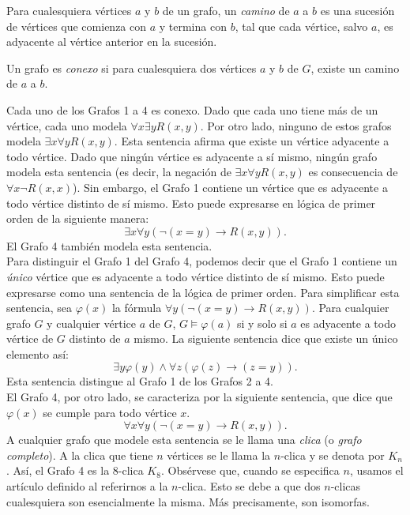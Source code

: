 \message{ !name(main.tex)}\documentclass[12pt,a4paper]{book}
\begin{document}
    \begin{definicion}\label{def:camino-grafo}
        Para cualesquiera vértices $a$ y $b$ de un grafo, un \textit{camino} de $a$ a $b$ es una sucesión de vértices que
        comienza con $a$ y termina con $b$, tal que cada vértice, salvo $a$, es adyacente al vértice anterior en la
        sucesión.
    \end{definicion}

    \begin{definicion}[Conexo]\label{def:conexo}
        Un grafo es \textit{conexo} si para cualesquiera dos vértices $a$ y $b$ de $G$, existe un camino de $a$ a $b$.
    \end{definicion}

    Cada uno de los Grafos 1 a 4 es conexo. Dado que cada uno tiene más de un vértice, cada uno modela
    $\forall x\exists yR(x,y)$. Por otro lado, ninguno de estos grafos modela $\exists x\forall yR(x,y)$. Esta sentencia
    afirma que existe un vértice adyacente a todo vértice. Dado que ningún vértice es adyacente a sí mismo, ningún grafo
    modela esta sentencia (es decir, la negación de $\exists x\forall yR(x,y)$ es consecuencia de $\forall x\neg R(x,x)$).
    Sin embargo, el Grafo 1 contiene un vértice que es adyacente a todo vértice distinto de sí mismo. Esto puede expresarse
    en lógica de primer orden de la siguiente manera:
    \begin{equation*}
        \exists x\forall y(\neg(x=y)\rightarrow R(x,y)).
    \end{equation*}
    El Grafo 4 también modela esta sentencia.\\
    Para distinguir el Grafo 1 del Grafo 4, podemos decir que el Grafo 1 contiene un \textit{único} vértice que es
    adyacente a todo vértice distinto de sí mismo. Esto puede expresarse como una sentencia de la lógica de primer orden.
    Para simplificar esta sentencia, sea $\varphi(x)$ la fórmula $\forall y(\neg(x=y)\rightarrow R(x,y))$. Para cualquier
    grafo $G$ y cualquier vértice $a$ de $G$, $G\models\varphi(a)$ si y solo si $a$ es adyacente a todo vértice de $G$
    distinto de $a$ mismo. La siguiente sentencia dice que existe un único elemento así:
    \begin{equation*}
        \exists y\varphi(y)\wedge\forall z(\varphi(z)\rightarrow(z=y)).
    \end{equation*}
    Esta sentencia distingue al Grafo 1 de los Grafos 2 a 4.\\
    El Grafo 4, por otro lado, se caracteriza por la siguiente sentencia, que dice que $\varphi(x)$ se cumple para todo
    vértice $x$.
    \begin{equation*}
        \forall x\forall y(\neg(x=y)\rightarrow R(x,y)).
    \end{equation*}
    A cualquier grafo que modele esta sentencia se le llama una \textit{clica} (o \textit{grafo completo}). A la clica que
    tiene $n$ vértices se le llama la $n$-clica y se denota por $K_{n}$. Así, el Grafo 4 es la 8-clica $K_{8}$. Obsérvese
    que, cuando se especifica $n$, usamos el artículo definido al referirnos a la $n$-clica. Esto se debe a que dos
    $n$-clicas cualesquiera son esencialmente la misma. Más precisamente, son isomorfas.
\end{document}
